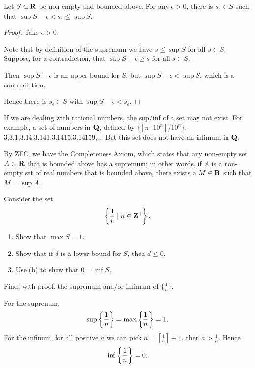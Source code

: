 \begin{proposition}
Let $S\subset\mathbf R$ be non-empty and bounded above. For any $\epsilon > 0$, there is $s_\epsilon \in S$ such that $\sup S-\epsilon < s_\epsilon \le \sup S$.
\end{proposition}

\begin{proof}
Take $\epsilon > 0$.

Note that by definition of the supremum we have $s \le \sup S$ for all $s \in S$. Suppose, for a contradiction, that $\sup S-\epsilon \ge s$ for all $s \in S$.

Then $\sup S-\epsilon$ is an upper bound for $S$, but $\sup S-\epsilon < \sup S$, which is a contradiction.

Hence there is $s_\epsilon \in S$ with $\sup S-\epsilon<s_\epsilon$.
\end{proof}

If we are dealing with rational numbers, the sup/inf of a set may not exist. For example, a set of numbers in $\mathbf Q$, defined by $\{[\pi\cdot10^n]/10^n\}$.
3,3.1,3.14,3.141,3.1415,3.14159,...
But this set does not have an infimum in $\mathbf Q$.

By ZFC, we have the Completeness Axiom, which states that any non-empty set $A \subset \mathbf R$ that is bounded above has a supremum; in other words, if $A$ is a non-empty set of real numbers that is bounded above, there exists a $M \in \mathbf R$ such that $M = \sup A$.

\begin{exercise}
Consider the set
\[\left\{\frac{1}{n}\mid n\in\mathbf Z^{+}\right\}.\]
\begin{enumerate}[label=(\alph*)]
\item Show that $\max S=1$.
\item Show that if $d$ is a lower bound for $S$, then $d \le 0$.
\item Use (b) to show that $0 = \inf S$.
\end{enumerate}
\end{exercise}

\begin{exercise}
Find, with proof, the supremum and/or infimum of $\{\frac{1}{n}\}$.
\end{exercise}

\begin{solution}
For the suprenum,
\[ \sup\left\{\frac{1}{n}\right\} = \max\left\{\frac{1}{n}\right\} = 1. \]
For the infinum, for all positive $a$ we can pick $n=[\frac{1}{a}]+1$, then $a>\frac{1}{n}$. Hence 
\[ \inf\left\{\frac{1}{n}\right\}=0. \]
\end{solution}

